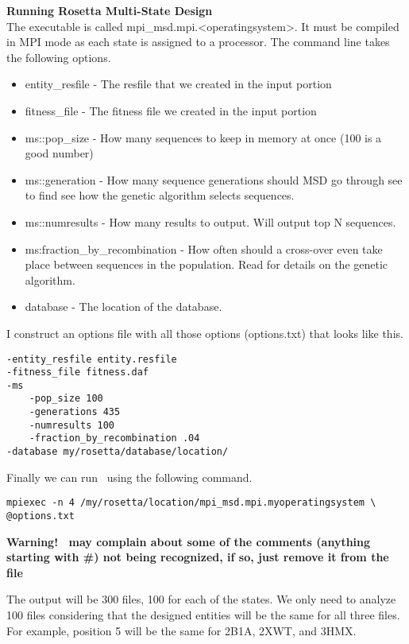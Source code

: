 \textbf{Running Rosetta Multi-State Design} \\
The \rosetta executable is called mpi\_msd.mpi.<operatingsystem>. It must be compiled in MPI mode as each state is assigned to a processor. The command line takes the following options.

\begin{itemize}
\item entity\_resfile - The resfile that we created in the input portion
\item fitness\_file - The fitness file we created in the input portion
\item ms::pop\_size - How many sequences to keep in memory at once (100 is a good number)
\item ms::generation - How many sequence generations should MSD go through see \citep{LeaverFay:2011ji} to find see how the genetic algorithm selects sequences.
\item ms::numresults - How many results to output. Will output top N sequences.
\item ms:fraction\_by\_recombination - How often should a cross-over even take place between sequences in the population. Read \citep{LeaverFay:2011ji} for details on the genetic algorithm.
\item database - The location of the database.
\end{itemize}

I construct an options file with all those options (options.txt) that looks like this.

\begin{lstlisting}
-entity_resfile entity.resfile
-fitness_file fitness.daf
-ms
    -pop_size 100
    -generations 435
    -numresults 100
    -fraction_by_recombination .04
-database my/rosetta/database/location/
\end{lstlisting}

Finally we can run \rosetta~using the following command.

\begin{lstlisting}
mpiexec -n 4 /my/rosetta/location/mpi_msd.mpi.myoperatingsystem \
@options.txt
\end{lstlisting}
\textbf{Warning! \linebreak \rosetta~may complain about some of the comments (anything starting with \#) not being recognized, if so, just remove it from the file}

The output will be 300 files, 100 for each of the states. We only need to analyze 100 files considering that the designed entities will be the same for all three files. For example, position 5 will be the same for 2B1A, 2XWT, and 3HMX.

